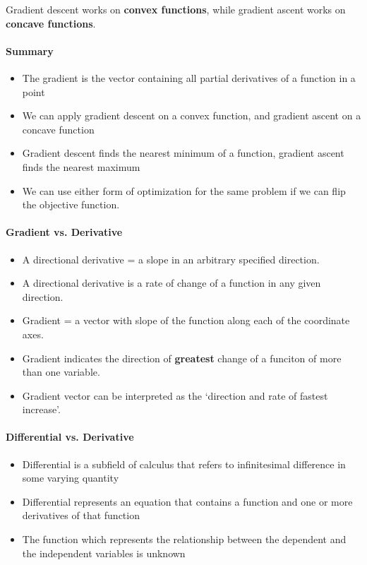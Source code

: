 \documentclass[lang=en,mode=geye,device=normal,color=blue,14pt]{elegantnote}
\DeclareMathOperator*{\1}{\mathbbm{1}}
\begin{document}
Gradient descent works on \textbf{convex functions}, while gradient ascent works on \textbf{concave functions}.

\paragraph{Summary}
\begin{itemize}
\item The gradient is the vector containing all partial derivatives of a function in a point
\item We can apply gradient descent on a convex function, and gradient ascent on a concave function
\item Gradient descent finds the nearest minimum of a function, gradient ascent finds the nearest maximum
\item We can use either form of optimization for the same problem if we can flip the objective function.
\end{itemize}

\paragraph{Gradient vs. Derivative}

\begin{itemize}
\item A directional derivative = a slope in an arbitrary specified direction.
\item A directional derivative is a rate of change of a function in any given direction.
\end{itemize}

\begin{itemize}
\item Gradient = a vector with slope of the function along each of the coordinate axes.
\item Gradient indicates the direction of \textbf{greatest} change of a funciton of more than one variable.
\item Gradient vector can be interpreted as the `direction and rate of fastest increase'.
\end{itemize}

\paragraph{Differential vs. Derivative}
\begin{itemize}
\item Differential is a subfield of calculus that refers to infinitesimal difference in some varying quantity
\item Differential represents an equation that contains a function and one or more derivatives of that function
\item The function which represents the relationship between the dependent and the independent variables is unknown
\end{itemize}
\end{document}
